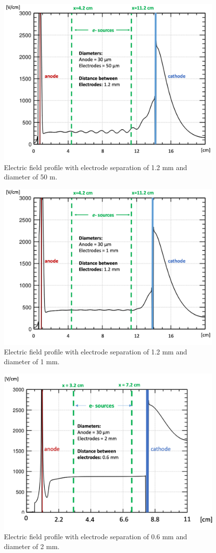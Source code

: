 \begin{figure}[H]
	\centering
	\includegraphics[width=0.8\linewidth]{figures/efield_bigsep.png}
	\caption{Electric field profile with electrode separation of 1.2 mm and diameter of 50 \textmu m.}
	\label{fig:eprof_bigsep}
\end{figure}
\begin{figure}[H]
	\centering
	\includegraphics[width=0.8\linewidth]{figures/efield_midsep.png}
	\caption{Electric field profile with electrode separation of 1.2 mm and diameter of 1 mm.}
	\label{fig:eprof_midsep}
\end{figure}
\begin{figure}[H]
	\centering
	\includegraphics[width=0.8\linewidth]{figures/efield_goodsep.png}
	\caption{Electric field profile with electrode separation of 0.6 mm and diameter of 2 mm.}
	\label{fig:eprof_goodsep}
\end{figure}


